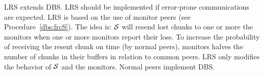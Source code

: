 LRS extends DBS. LRS should be implemented if error-prone
communications are expected. LRS is based on the use of monitor peers
(see Procedure~\ref{dbs:frcS}). The idea is: ${\cal S}$ will resend
lost chunks to one or more the monitors when one or more monitors
report their loss. To increase the probability of receiving the resent
chunk on time (by normal peers), monitors halves the number of chunks
in their buffers in relation to common peers. LRS only modifies the
behavior of ${\cal S}$ and the monitors. Normal peers implement DBS.

\begin{comment}
LRS should be used when it is expected to have loss-prone
communication links or when the bit-rate of the stream exceeds the
uploading capacity of the nodes. Notice that the impact of using LSR
for normal peers is null.

P2PSP relies in UDP to transmit the chunks, and obviously, packet
losses can happen. The impact of a packet loss in the QoS provided
depends on where the packets are lost and who lost it. If a packet is
lost in its trip between the splitter and a peer, this packet will be
missed by all the team.

\subsubsection{Monitor peers}
The overlay administrator can create some special peers called, in
short,\emph{monitors}. These peers are introduced to the rest of peers
of the team as normal peers and behave like the rest of well-intended
peers, churn included. Monitor peers can be asked by the splitter to
check whether the operation of the team has and is been correct.

\subsubsection{Selfish peers rejection}
Another functionality of monitors is to tell the splitter which chunks
have not been received on time (the consequence of receiving a lost
too late is the same than not receiving it never). The splitter
memorizes which chunk has been sent to each peer in the current
round. If all monitors reports that a chunk has been lost, the
splitter can determine which peer has been in charge of broadcasting
that chunk and take note of this. If this problem happens a given
number of times, the splitter can expell the unreliable peer from the
team by stop sending to it futher chunks.


\end{comment}
